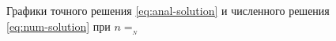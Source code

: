 
\begin{figure}[htb]
  \centering
  \caption{Графики точного решения \eqref{eq:anal-solution} и
    численного решения \eqref{eq:num-solution} при $n=__N$}
  \label{fig:numeric-plot}
\end{figure}

